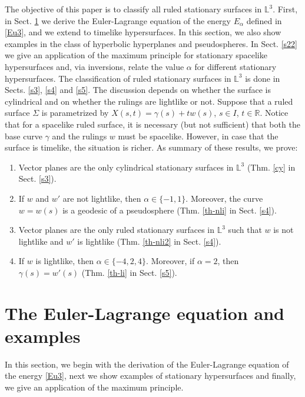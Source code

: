 \documentclass[a4paper,12pt]{amsart}
\theoremstyle{definition}
\def\r{\mathbb R}
\def\l{\mathbb L}
\begin{document}
 The   objective of this paper is to classify all ruled stationary surfaces in $\l^3$. First, in Sect. \ref{s2} we derive the Euler-Lagrange equation of the energy $E_\alpha$ defined in \eqref{Eu3}, and we extend to timelike hypersurfaces. In this section, we also show examples in the class of hyperbolic hyperplanes and pseudospheres.  In Sect. \ref{s22} we give an application of the maximum principle for stationary spacelike hypersurfaces and, via inversions, relate the value $\alpha$ for different stationary hypersurfaces. The classification of ruled stationary surfaces in $\l^3$ is done in Sects. \ref{s3}, \ref{s4} and \ref{s5}. The discussion depends on whether the surface is cylindrical and on whether the rulings are lightlike or not.  Suppose that a ruled surface $\Sigma$ is parametrized by $X(s,t)=\gamma(s)+tw(s)$, $s\in I$, $t\in\r$. Notice that for a spacelike ruled surface, it is necessary (but not sufficient) that both the base curve $\gamma$  and the rulings $w$ must be spacelike. However, in case that the surface is timelike, the situation is richer. As summary of these results, we prove:
 \begin{enumerate}
 \item Vector planes are the only cylindrical stationary surfaces in $\l^3$ (Thm. \ref{cy} in Sect. \ref{s3}).
 \item If $w$ and $w'$ are not lightlike, then $\alpha\in\{-1,1\}$. Moreover, the curve $w=w(s)$ is a geodesic of   a pseudosphere (Thm. \ref{th-nli} in Sect. \ref{s4}). 
 \item Vector planes are the only ruled stationary surfaces in $\l^3$ such that  $w$ is not lightlike and $w'$ is lightlike (Thm. \ref{th-nli2} in Sect. \ref{s4}). 
 \item If $w$ is lightlike, then $\alpha\in\{-4, 2,4\}$. Moreover, if $\alpha= 2$, then $\gamma(s)=w'(s)$  (Thm. \ref{th-li} in Sect. \ref{s5}). 
 \end{enumerate}



 

\section{The Euler-Lagrange equation and examples}\label{s2}

 In this section, we begin with the derivation of the Euler-Lagrange equation of the energy \eqref{Eu3}, next we show examples of stationary hypersurfaces and finally, we give an application of the maximum principle. 
\end{document}

